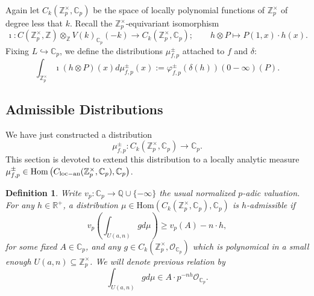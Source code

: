 \documentclass{amsart}
\newtheorem{defn0}{Definition}[section]
\newtheorem{remark0}[defn0]{Remark}
\newenvironment{definition}{\begin{defn0}\rm}{\end{defn0}}
\newenvironment{remark}{\begin{remark0}\rm}{\end{remark0}}
\newcommand{\Z}{{\mathbb Z}}
\newcommand{\Q}{{\mathbb Q}}
\newcommand{\C}{{\mathbb C}}
\newcommand{\R}{{\mathbb R}}
\newcommand{\cO}{{\mathcal O}}
\newcommand{\Hom}{{\mathrm {Hom}}}
\begin{document}
Again let $C_k(\Z_p^\times,\C_p)$ be the space of locally polynomial functions of $\Z_p^\times$ of degree less that $k$. Recall the $\Z_p^\times$-equivariant isomorphism
\begin{equation}\label{imathpol}
\imath:C(\Z_p^\times,\Z)\otimes_\Z V(k)_{\C_p}(-k)\longrightarrow C_k(\Z_p^\times,\C_p) ;\qquad h\otimes P\longmapsto P(1,x)\cdot h(x).
\end{equation}
Fixing $L\hookrightarrow\C_p$, we define the distributions $\mu^\pm_{f,p}$ attached to $f$ and $\delta$:
\begin{equation}\label{defmugen}
\int_{\Z_p^\times}\imath(h\otimes P)(x)d\mu^\pm_{f,p}(x):=\varphi_{f,p}^\pm(\delta(h))(0-\infty)(P).
\end{equation}



\subsection{Admissible Distributions}

We have just constructed a distribution 
\[
\mu_{f,p}^\pm:C_k(\Z_p^\times,\C_p)\longrightarrow \C_p.
\]
This section is devoted to extend this distribution to a locally analytic measure $\mu_{f,p}^\pm\in\Hom\left(C_{\rm loc-an}(\Z_p^\times,\C_p),\C_p\right)$.

\begin{definition}
Write $v_p:\C_p\rightarrow\Q\cup\{-\infty\}$ the usual normalized $p$-adic valuation. 
For any $h\in \R^+$,
a distribution $\mu\in \Hom(C_k(\Z_p^\times,\C_p),\C_p)$ is \emph{$h$-admissible} if 
\[
v_p\left(\int_{U(a,n)}g d\mu\right)\geq v_p(A)-n\cdot h,
\]
for some fixed $A\in \C_p$, and any $g\in C_k(\Z_p^\times,\cO_{\C_p})$ which is polynomical in a small enough $U(a,n)\subseteq\Z_p^\times$. We will denote previous relation by
\[
\int_{U(a,n)}g d\mu\in A\cdot p^{-n h}\cO_{\C_p}.
\]
\end{definition}
\end{document}
